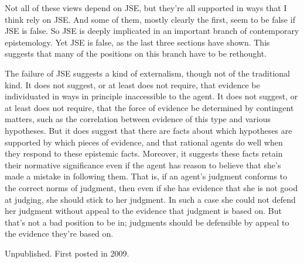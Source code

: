 \documentclass[
  11pt,
  letterpaper,
  DIV=11,
  numbers=noendperiod,
  twoside]{scrartcl}
\begin{document}
Not all of these views depend on JSE, but they're all supported in ways
that I think rely on JSE. And some of them, mostly clearly the first,
seem to be false if JSE is false. So JSE is deeply implicated in an
important branch of contemporary epistemology. Yet JSE is false, as the
last three sections have shown. This suggests that many of the positions
on this branch have to be rethought.

The failure of JSE suggests a kind of externalism, though not of the
traditional kind. It does not suggest, or at least does not require,
that evidence be individuated in ways in principle inaccessible to the
agent. It does not suggest, or at least does not require, that the force
of evidence be determined by contingent matters, such as the correlation
between evidence of this type and various hypotheses. But it does
suggest that there are facts about which hypotheses are supported by
which pieces of evidence, and that rational agents do well when they
respond to these epistemic facts. Moreover, it suggests these facts
retain their normative significance even if the agent has reason to
believe that she's made a mistake in following them. That is, if an
agent's judgment conforms to the correct norms of judgment, then even if
she has evidence that she is not good at judging, she should stick to
her judgment. In such a case she could not defend her judgment without
appeal to the evidence that judgment is based on. But that's not a bad
position to be in; judgments should be defensible by appeal to the
evidence they're based on.



\noindent Unpublished. First posted in 2009.
\end{document}

